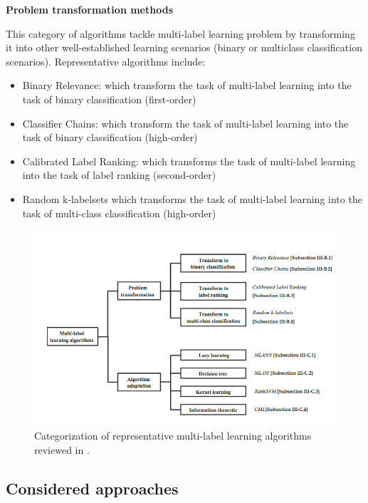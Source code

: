 \textbf{Problem transformation methods}

This category of algorithms tackle multi-label learning problem by transforming it into other well-established learning scenarios (binary or multiclass classification scenarios). 
Representative algorithms include:
\begin{itemize}
 \item Binary Relevance: which transform the task of multi-label learning into the task of binary classification (first-order)
 \item Classifier Chains: which transform the task of multi-label learning into the task of binary classification (high-order)
 \item Calibrated Label Ranking: which transforms the task of multi-label learning into the task of label ranking (second-order)
 \item Random k-labelsets which transforms the task of multi-label learning into the task of multi-class classification (high-order)
\end{itemize}

\begin{figure}[H]
\centering
\includegraphics[scale=0.6]{./images/machine-learning/multi-label-approaches.png}
\caption{Categorization of representative multi-label learning algorithms reviewed in \cite[this paper]{MultilabelReview}.}
\label{fig:multilabelOverview}
\end{figure}


\subsection{Considered approaches}

